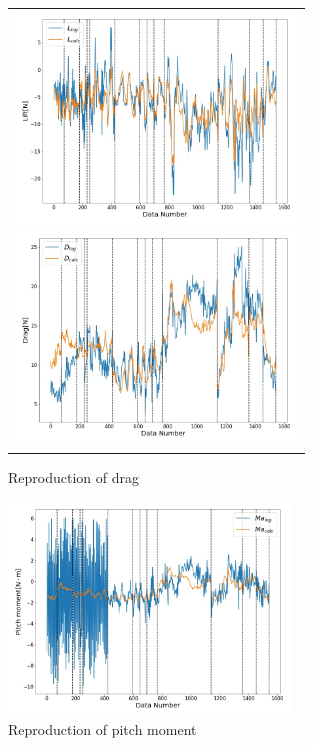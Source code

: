 \begin{figure}[htbp]
	\begin{center}
		\begin{tabular}{c}
			\begin{minipage}{0.5\hsize}
				\begin{center}
					\includegraphics[clip,width=7.5cm,bb=0 0 864 654]{./z_figure_files/chapter4/L.jpeg}
					\caption{Reproduction of lift}
					\label{fig:L_re}
				\end{center}
			\end{minipage}
			\begin{minipage}{0.5\hsize}
				\begin{center}
					\includegraphics[clip,width=7.5cm,bb=0 0 864 654]{./z_figure_files/chapter4/D.jpeg}
					\caption{Reproduction of drag}
					\label{fig:D_re}
				\end{center}
			\end{minipage}
		\end{tabular}
	\end{center}
\end{figure}
\begin{figure}[H]
  \begin{center}
    \includegraphics[clip,width=7.5cm,bb=0 0 864 654]{./z_figure_files/chapter4/Ma.jpeg}
    \caption{Reproduction of pitch moment}
    \label{fig:Ma_re}
  \end{center}
\end{figure}


